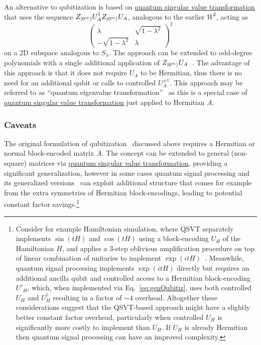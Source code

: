 \begin{refsection}
An alternative to qubitization is based on \hyperref[prim:QSVT]{quantum singular value transformation} that uses the sequence $Z_{\lvert0^m\rangle} U_A^\dag Z_{\lvert0^m\rangle} U_A $, analogous to the earlier $W^2$, acting as 
\begin{equation}
    \nonumber \left(\begin{array}{cc} \lambda & \sqrt{1-\lambda^2} \\ -\sqrt{1-\lambda^2} & \lambda    \end{array}\right)^{\!\!2}
\end{equation} 
on a 2D subspace analogous to $S_\lambda$. The approach can be extended to odd-degree polynomials with a single additional application of $Z_{\lvert0^m\rangle} U_A$~\cite{gilyen2018QSingValTransf}. The advantage of this approach is that it does not require $U_A$ to be Hermitian, thus there is no need for an additional qubit or calls to controlled $U_A^{\pm 1}$. This approach may be referred to as ``quantum eigenvalue transformation''~\cite{lin2022LectureNotes,mcardle2022StatePreparation} as this is a special case of \hyperref[prim:QSVT]{quantum singular value transformation} just applied to Hermitian $A$.



\subsubsection*{Caveats}
The original formulation of qubitization~\cite{low2016HamSimQubitization} discussed above requires a Hermitian or normal block-encoded matrix $A$. The concept can be extended to general (non-square) matrices via \hyperref[prim:QSVT]{quantum singular value transformation}, providing a significant generalization, however in some cases quantum signal processing and its generalized versions~\cite{haah2018ProdDecPerFuncQSignPRoc,chao2020FindingAngleSequences} can exploit additional structure that comes for example from the extra symmetries of Hermitian block-encodings, leading to potential constant factor savings.\footnote{Consider for example Hamiltonian simulation, where QSVT separately implements $\sin(t H)$ and $\cos(t H)$ using a block-encoding $U_H$ of the Hamiltonian $H$, and applies a 3-step oblivious amplification procedure on top of linear combination of unitaries to implement $\exp( i t H)$~\cite{gilyen2018QSingValTransf}. Meanwhile, quantum signal processing implements $\exp( i t H)$ directly but requires an additional ancilla qubit and controlled access to a Hermitian block-encoding $U'_H$, which, when implemented via Eq.~\eqref{eq:genQubitiz}, uses both controlled $U_H$ and $U_H^\dagger$ resulting in a factor of $\sim 4$ overhead. Altogether these considerations suggest that the QSVT-based approach might have a slightly better constant factor overhead, particularly when controlled $U_H$ is significantly more costly to implement than $U_H$. If $U_H$ is already Hermitian then quantum signal processing can have an improved complexity.}


\end{refsection}
